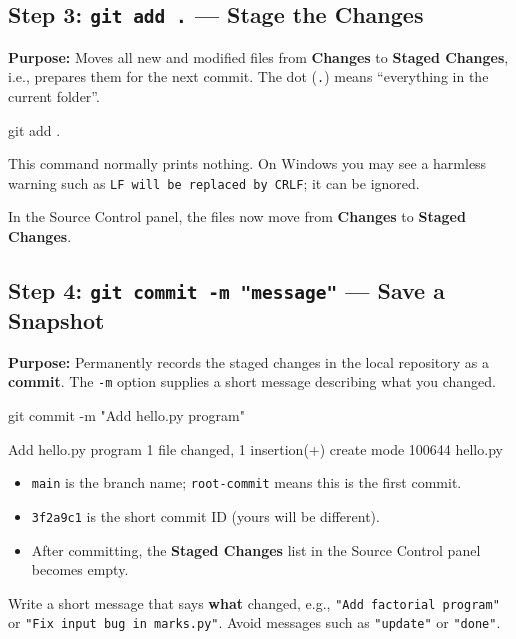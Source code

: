 \documentclass[11pt,a4paper]{article}
\newcommand{\code}[1]{\texttt{#1}}
\begin{document}
\subsection{Step 3: \code{git add .} --- Stage the Changes}

\textbf{Purpose:} Moves all new and modified files from \textbf{Changes} to \textbf{Staged Changes}, i.e., prepares them for the next commit. The dot (\code{.}) means ``everything in the current folder''.

\begin{cmd}
git add .
\end{cmd}

This command normally prints nothing. On Windows you may see a harmless warning such as \code{LF will be replaced by CRLF}; it can be ignored.

In the Source Control panel, the files now move from \textbf{Changes} to \textbf{Staged Changes}.

\subsection{Step 4: \code{git commit -m "message"} --- Save a Snapshot}

\textbf{Purpose:} Permanently records the staged changes in the local repository as a \textbf{commit}. The \code{-m} option supplies a short message describing what you changed.

\begin{cmd}
git commit -m "Add hello.py program"
\end{cmd}
\begin{outbox}
 Add hello.py program
 1 file changed, 1 insertion(+)
 create mode 100644 hello.py
\end{outbox}

\begin{itemize}
\item \code{main} is the branch name; \code{root-commit} means this is the first commit.
\item \code{3f2a9c1} is the short commit ID (yours will be different).
\item After committing, the \textbf{Staged Changes} list in the Source Control panel becomes empty.
\end{itemize}

\begin{notebox}
Write a short message that says \textbf{what} changed, e.g., \code{"Add factorial program"} or \code{"Fix input bug in marks.py"}. Avoid messages such as \code{"update"} or \code{"done"}.
\end{notebox}
\end{document}
